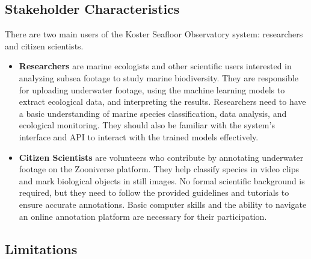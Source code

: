 \subsection{Stakeholder Characteristics}

There are two main users of the Koster Seafloor Observatory system: researchers and citizen scientists.

\begin{itemize}
    \item \textbf{Researchers} are marine ecologists and other scientific users interested in analyzing subsea footage to study marine biodiversity. They are responsible for uploading underwater footage, using the machine learning models to extract ecological data, and interpreting the results. Researchers need to have a basic understanding of marine species classification, data analysis, and ecological monitoring. They should also be familiar with the system's interface and API to interact with the trained models effectively.

    \item \textbf{Citizen Scientists} are volunteers who contribute by annotating underwater footage on the Zooniverse platform. They help classify species in video clips and mark biological objects in still images. No formal scientific background is required, but they need to follow the provided guidelines and tutorials to ensure accurate annotations. Basic computer skills and the ability to navigate an online annotation platform are necessary for their participation.
\end{itemize}

\subsection{Limitations}


